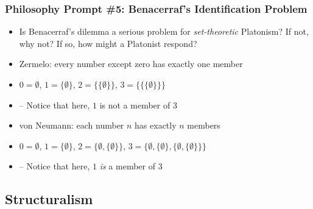\begin{frame}
\frametitle{Philosophy Prompt \#5: Benacerraf's Identification Problem}

\begin{itemize}[<+->]

\item Is Benacerraf's dilemma a serious problem for \textit{set-theoretic} Platonism? If not, why not? If so, how might a Platonist respond?

\item Zermelo: every number except zero has exactly one member

\item[] $0 = \emptyset$, $1 = \{\emptyset\}$, $2 = \{ \{ \emptyset \} \}$, $3 = \{ \{ \{ \emptyset \} \} \}$
\item[] -- Notice that here, $1$ is not a member of $3$

\item von Neumann: each number $n$ has exactly $n$ members
\item[] $0 = \emptyset$, $1 = \{\emptyset\}$, $2 = \{\emptyset, \{\emptyset\} \}$, $3 = \{\emptyset, \{\emptyset\}, \{\emptyset, \{\emptyset\} \} \}$
\item[] -- Notice that here, $1$ \textit{is} a member of $3$

\end{itemize}
\end{frame}

\subsection{Structuralism}

